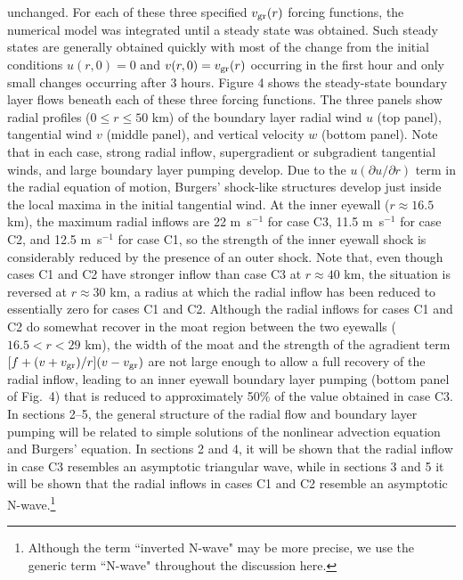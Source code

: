 \documentclass[10pt]{article}
\begin{document}
unchanged. For each of these three specified $v_{\rm gr}(r)$ forcing
functions, the numerical model was integrated until a steady state was
obtained. Such steady states are generally obtained quickly with most
of the change from the initial conditions
$u(r,0)=0$ and $v(r,0)=v_{\rm gr}(r)$ occurring in the first hour and only
small changes occurring after 3 hours. Figure 4 shows the steady-state
boundary layer flows beneath each of these three forcing functions.  The three
panels show radial profiles ($0 \le r \le 50$ km) of the
boundary layer radial wind $u$ (top panel), tangential wind $v$ (middle panel),
and vertical velocity $w$ (bottom panel). Note that in each case, strong
radial inflow, supergradient or subgradient tangential winds, and large boundary
layer pumping develop. Due to the $u(\partial u/\partial r)$ term in the
radial equation of motion, Burgers' shock-like structures develop just
inside the local maxima in the initial tangential wind.  At the inner
eyewall ($r \approx 16.5$ km), the maximum radial inflows are 22 m~s$^{-1}$
for case C3, 11.5 m~s$^{-1}$ for case C2, and 12.5 m~s$^{-1}$ for case C1,
so the strength of the inner eyewall shock is considerably reduced by the
presence of an outer shock. Note that, even though cases C1 and C2 have
stronger inflow than case C3 at $r \approx 40$ km, the situation is reversed
at $r \approx 30$ km, a radius at which the radial inflow has been reduced
to essentially zero for cases C1 and C2. Although the radial inflows for
cases C1 and C2 do somewhat recover in the moat region between the two eyewalls
($16.5 < r < 29$ km), the width of the moat and the strength of the agradient term
$[f + (v+v_{\rm gr})/r](v-v_{\rm gr})$ are not large enough to allow a full
recovery of the radial inflow, leading to an inner eyewall boundary layer pumping
(bottom panel of Fig.~4) that is reduced to approximately 50\% of the value
obtained in case C3. In sections 2--5, the general structure of the radial
flow and boundary layer pumping will be related to simple solutions of
the nonlinear advection equation and Burgers' equation.
In sections 2 and 4, it will be shown that the radial inflow
in case C3 resembles an asymptotic triangular wave, while in sections 3 and 5
it will be shown that the radial inflows in cases C1 and C2 resemble an asymptotic
N-wave.\footnote{Although the term ``inverted N-wave" may be more precise, we
use the generic term ``N-wave" throughout the discussion here.}
\end{document}
